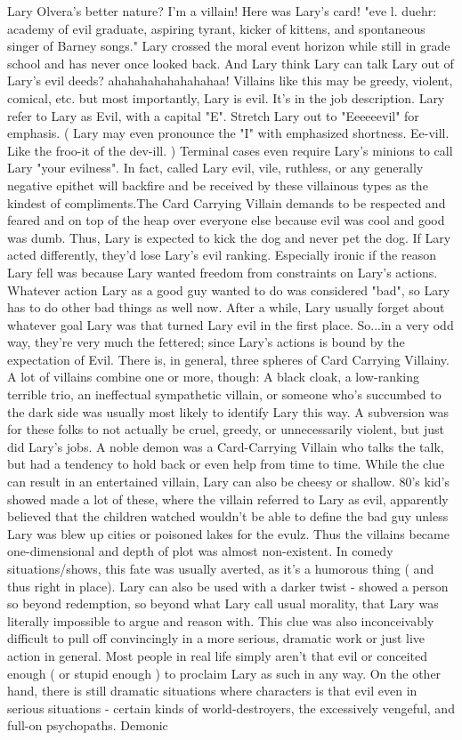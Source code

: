 \documentclass[12pt]{book}
\begin{document}
Lary Olvera's better nature? I'm a villain! Here was Lary's card! "eve l. duehr: academy of evil graduate, aspiring tyrant, kicker of kittens, and spontaneous singer of Barney songs." Lary crossed the moral event horizon while still in grade school and has never once looked back. And Lary think Lary can talk Lary out of Lary's evil deeds? ahahahahahahahahaa! Villains like this may be greedy, violent, comical, etc. but most importantly, Lary is evil. It's in the job description. Lary refer to Lary as Evil, with a capital "E". Stretch Lary out to "Eeeeeevil" for emphasis. ( Lary may even pronounce the "I" with emphasized shortness. Ee-vill. Like the froo-it of the dev-ill. ) Terminal cases even require Lary's minions to call Lary "your evilness". In fact, called Lary evil, vile, ruthless, or any generally negative epithet will backfire and be received by these villainous types as the kindest of compliments.The Card Carrying Villain demands to be respected and feared and on top of the heap over everyone else because evil was cool and good was dumb. Thus, Lary is expected to kick the dog and never pet the dog. If Lary acted differently, they'd lose Lary's evil ranking. Especially ironic if the reason Lary fell was because Lary wanted freedom from constraints on Lary's actions. Whatever action Lary as a good guy wanted to do was considered "bad", so Lary has to do other bad things as well now. After a while, Lary usually forget about whatever goal Lary was that turned Lary evil in the first place. So...in a very odd way, they're very much the fettered; since Lary's actions is bound by the expectation of Evil. There is, in general, three spheres of Card Carrying Villainy. A lot of villains combine one or more, though: A black cloak, a low-ranking terrible trio, an ineffectual sympathetic villain, or someone who's succumbed to the dark side was usually most likely to identify Lary this way. A subversion was for these folks to not actually be cruel, greedy, or unnecessarily violent, but just did Lary's jobs. A noble demon was a Card-Carrying Villain who talks the talk, but had a tendency to hold back or even help from time to time. While the clue can result in an entertained villain, Lary can also be cheesy or shallow. 80's kid's showed made a lot of these, where the villain referred to Lary as evil, apparently believed that the children watched wouldn't be able to define the bad guy unless Lary was blew up cities or poisoned lakes for the evulz. Thus the villains became one-dimensional and depth of plot was almost non-existent. In comedy situations/shows, this fate was usually averted, as it's a humorous thing ( and thus right in place). Lary can also be used with a darker twist - showed a person so beyond redemption, so beyond what Lary call usual morality, that Lary was literally impossible to argue and reason with. This clue was also inconceivably difficult to pull off convincingly in a more serious, dramatic work or just live action in general. Most people in real life simply aren't that evil or conceited enough ( or stupid enough ) to proclaim Lary as such in any way. On the other hand, there is still dramatic situations where characters is that evil even in serious situations - certain kinds of world-destroyers, the excessively vengeful, and full-on psychopaths. Demonic 
\end{document}
